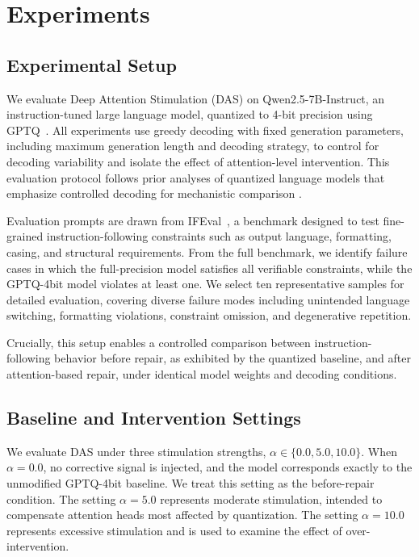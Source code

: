 \section{Experiments}
\label{sec:experiments}

\subsection{Experimental Setup}

We evaluate Deep Attention Stimulation (DAS) on Qwen2.5-7B-Instruct,
an instruction-tuned large language model,
quantized to 4-bit precision using GPTQ~\citep{frantar2022gptq}.
All experiments use greedy decoding with fixed generation parameters,
including maximum generation length and decoding strategy,
to control for decoding variability and isolate the effect
of attention-level intervention.
This evaluation protocol follows prior analyses of quantized language models
that emphasize controlled decoding for mechanistic comparison
\citep{dettmers2022llmint8,lin2023awq}.

Evaluation prompts are drawn from IFEval~\citep{zhou2023ifeval},
a benchmark designed to test fine-grained instruction-following constraints
such as output language, formatting, casing, and structural requirements.
From the full benchmark, we identify failure cases in which
the full-precision model satisfies all verifiable constraints,
while the GPTQ-4bit model violates at least one.
We select ten representative samples for detailed evaluation,
covering diverse failure modes including unintended language switching,
formatting violations, constraint omission,
and degenerative repetition.

Crucially, this setup enables a controlled comparison between
instruction-following behavior before repair,
as exhibited by the quantized baseline,
and after attention-based repair,
under identical model weights and decoding conditions.

\subsection{Baseline and Intervention Settings}

We evaluate DAS under three stimulation strengths,
$\alpha \in \{0.0, 5.0, 10.0\}$.
When $\alpha = 0.0$, no corrective signal is injected,
and the model corresponds exactly to the unmodified GPTQ-4bit baseline.
We treat this setting as the before-repair condition.
The setting $\alpha = 5.0$ represents moderate stimulation,
intended to compensate attention heads most affected by quantization.
The setting $\alpha = 10.0$ represents excessive stimulation
and is used to examine the effect of over-intervention.

